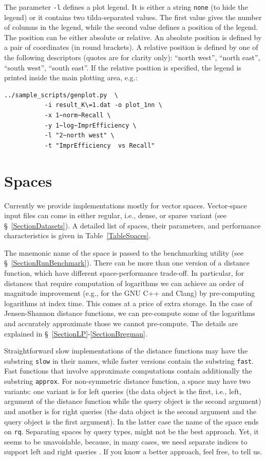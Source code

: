 \documentclass[runningheads,a4paper]{llncs}
\newcommand{\ttt}[1]{\texttt{#1}}
\begin{document}
{The parameter \ttt{-l} defines a plot legend.
It is either a string \ttt{none} (to hide the legend) 
or  it contains two tilda-separated values.
The first value gives the number of columns in the legend, while the second value
defines a position of the legend. The position can be either 
absolute or relative.
An absolute position is defined by a pair of coordinates (in round brackets).
A relative position is defined by one of the following descriptors 
(quotes are for clarity only): ``north west'', ``north east'', ``south west'', ``south east''.
If the relative position is specified, the legend is printed inside the main
plotting area, e.g.:
\begin{verbatim}
../sample_scripts/genplot.py  \
           -i result_K\=1.dat -o plot_1nn \
           -x 1~norm~Recall \
           -y 1~log~ImprEfficiency \
           -l "2~north west" \
           -t "ImprEfficiency  vs Recall"
\end{verbatim}


\section{Spaces}\label{SectionSpaces}
Currently we provide implementations mostly for vector spaces.
Vector-space input files can come in either regular, i.e., dense,
or sparse variant (see \S~\ref{SectionDatasets}). 
A detailed list of spaces, their parameters, 
and performance characteristics is given in Table~\ref{TableSpaces}.

The mnemonic name of the space is passed to the benchmarking utility (see \S~\ref{SectionRunBenchmark}).
There can be more than one version of a distance function,
which have different space-performance trade-off.
In particular, for distances that require computation of logarithms 
we can achieve an order of magnitude improvement (e.g., for the GNU C++
and Clang) by pre-computing
logarithms at index time. This comes at a price of extra storage. 
In the case of Jensen-Shannon distance functions, we can pre-compute some 
of the logarithms and accurately approximate those we cannot pre-compute.
The details are explained in \S~\ref{SectionLP}-\ref{SectionBregman}.

Straightforward slow implementations of the distance functions may have the substring \ttt{slow}
in their names, while faster versions contain the substring \ttt{fast}.
Fast functions that involve approximate computations contain additionally the substring \ttt{approx}.
For non-symmetric distance function, a space may have two variants: one variant is for left
queries (the data object is the first, i.e., left, argument of the distance function 
while the query object
is the second argument) 
and another is for right queries (the data object is the second argument and the query object is the first argument).
In the latter case the name of the space ends on \ttt{rq}.
Separating spaces by query types, might not be the best approach.
Yet, it seems to be unavoidable, because, in many cases,
we need separate indices to support left and right queries \cite{Cayton2008}.
If you know a better approach, feel free, to tell us.

}
\end{document}
